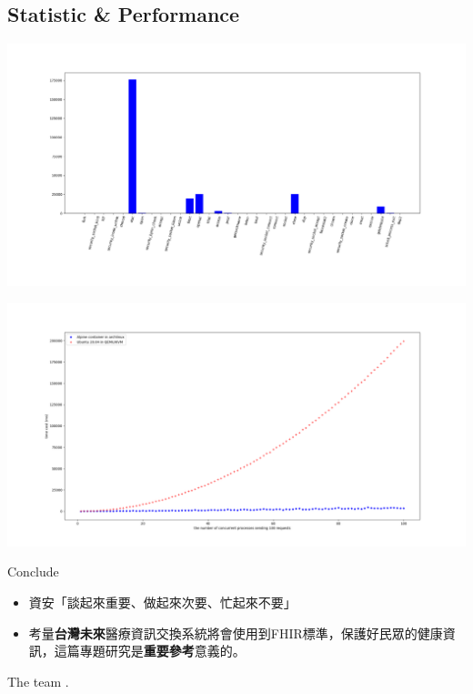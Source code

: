 \documentclass{beamer}
\begin{document}
\begin{CJK*}{UTF8}{bsmi}
    \section{Statistic \& Performance}
    \begin{frame}
        \centering
        \includegraphics[width=\textwidth, height=\textheight]{hist.png}
    \end{frame}
    \begin{frame}
        \centering
        \includegraphics[width=\textwidth, height=\textheight]{concurrent.png}
    \end{frame}

    \begin{frame}{Conclude}
        \centering
        \begin{itemize}
            \item 資安「談起來重要、做起來次要、忙起來不要」
            \item 考量{\color{mycolor}\textbf{台灣未來}}醫療資訊交換系統將會使用到FHIR標準，保護好民眾的健康資訊，這篇專題研究是{\color{mycolor}\textbf{重要參考}}意義的。
        \end{itemize}
        \centering
        The team {\fontsize{60}{60}}.
    \end{frame}

\end{CJK*}
\end{document}
